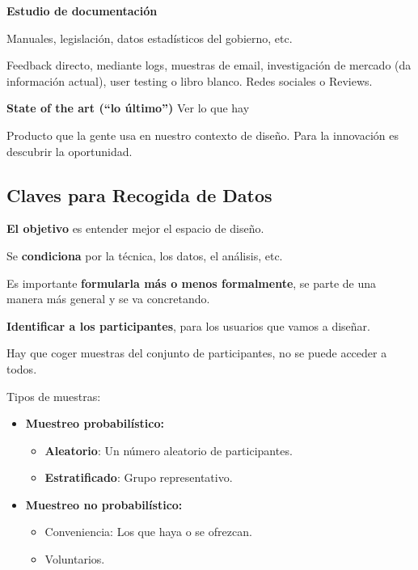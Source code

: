 \documentclass[12pt, twoside, openright]{report} %
\begin{document}
\textbf{Estudio de documentación}

Manuales, legislación, datos estadísticos del gobierno, etc.

Feedback directo, mediante logs, muestras de email, investigación de
mercado (da información actual), user testing o libro blanco. Redes
sociales o Reviews.

\textbf{State of the art (``lo último'')} Ver lo que hay

Producto que la gente usa en nuestro contexto de diseño. Para la
innovación es descubrir la oportunidad.

\subsection{Claves para Recogida de
	Datos}

\textbf{El objetivo} es entender mejor el espacio de diseño.

Se \textbf{condiciona} por la técnica, los datos, el análisis, etc.

Es importante \textbf{formularla más o menos formalmente}, se parte de
una manera más general y se va concretando.

\textbf{Identificar a los participantes}, para los usuarios que vamos a
diseñar.

Hay que coger muestras del conjunto de participantes, no se puede
acceder a todos.

\newpage

Tipos de muestras:

\begin{itemize}
	\item \textbf{Muestreo probabilístico:}

	      \begin{itemize}
		      \item \textbf{Aleatorio}: Un número aleatorio de participantes.
		      \item \textbf{Estratificado}: Grupo representativo.
	      \end{itemize}
	\item \textbf{Muestreo no probabilístico:}

	      \begin{itemize}
		      \item Conveniencia: Los que haya o se ofrezcan.
		      \item Voluntarios.
	      \end{itemize}
\end{itemize}
\end{document}
